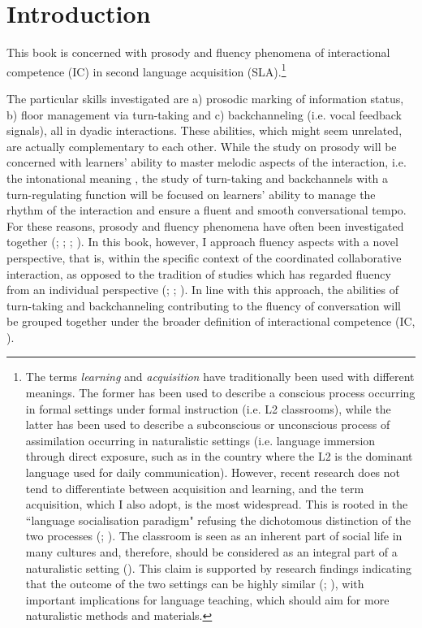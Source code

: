 \chapter{Introduction}
\label{chap:1}

This book is concerned with prosody and fluency phenomena of interactional competence (IC) in second language acquisition (SLA).\footnote{The terms \textit{learning} and \textit{acquisition} have traditionally been used with different meanings. The former has been used to describe a conscious process occurring in formal settings under formal instruction (i.e. L2 classrooms), while the latter has been used to describe a subconscious or unconscious process of assimilation occurring in naturalistic settings (i.e. language immersion through direct exposure, such as in the country where the L2 is the dominant language used for daily communication). However, recent research does not tend to differentiate between acquisition and learning, and the term acquisition, which I also adopt, is the most widespread. This is rooted in the ``language socialisation paradigm" \citep{Watson-Gegeo2004} refusing the dichotomous distinction of the two processes (\citealt{BaraschJames1994}; \citealt{Ellis1989}). The classroom is seen as an inherent part of social life in many cultures and, therefore, should be considered as an integral part of a naturalistic setting (\citealt{Watson-GegeoNielsen2003}). This claim is supported by research findings indicating that the outcome of the two settings can be highly similar (\citealt{Rivers1994}; \citealt{Willett1995}), with important implications for language teaching, which should aim for more naturalistic methods and materials.} 

The particular skills investigated are a) prosodic marking of information status, b) floor management via turn-taking and c) backchanneling (i.e. vocal feedback signals), all in dyadic interactions. These abilities, which might seem unrelated, are actually complementary to each other. While the study on prosody will be concerned with learners’ ability to master melodic aspects of the interaction, i.e. the intonational meaning \citep{Wennerstrom2006}, the study of turn-taking and backchannels with a turn-regulating function will be focused on learners’ ability to manage the rhythm of the interaction and ensure a fluent and smooth conversational tempo. For these reasons, prosody and fluency phenomena have often been investigated together (\citealt{TrofimovichBaker2007}; \citealt{TsengEtAl2005}; \citealt{KallioEtAl2023}; \citealt{Ashby2016}). In this book, however, I approach fluency aspects with a novel perspective, that is, within the specific context of the coordinated collaborative interaction, as opposed to the tradition of studies which has regarded fluency from an individual perspective (\citealt{TavakoliSkehan2005}; \citealt{Segalowitz2010}; \citealt{Kormos2006}). In line with this approach, the abilities of turn-taking and backchanneling contributing to the fluency of conversation will be grouped together under the broader definition of interactional competence (IC, \citealt{Young2014}).

